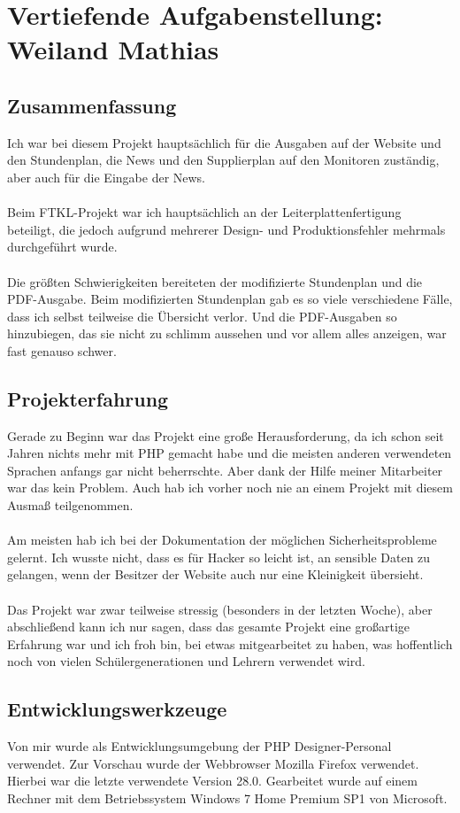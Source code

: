 \chapter[Weiland]{Vertiefende Aufgabenstellung: \\Weiland Mathias}

\section{Zusammenfassung}
Ich war bei diesem Projekt hauptsächlich für die Ausgaben auf der Website und den Stundenplan, die News und den Supplierplan auf den Monitoren zuständig, aber auch für die Eingabe der News. \\\\
Beim FTKL-Projekt war ich hauptsächlich an der Leiterplattenfertigung beteiligt, die jedoch aufgrund mehrerer Design- und Produktionsfehler mehrmals durchgeführt wurde.\\\\
Die größten Schwierigkeiten bereiteten der modifizierte Stundenplan und die PDF-Ausgabe. Beim modifizierten Stundenplan gab es so viele verschiedene Fälle, dass ich selbst teilweise die Übersicht verlor. Und die PDF-Ausgaben so hinzubiegen, das sie nicht zu schlimm aussehen und vor allem alles anzeigen, war fast genauso schwer.
\section{Projekterfahrung}
Gerade zu Beginn war das Projekt eine große Herausforderung, da ich schon seit Jahren nichts mehr mit PHP gemacht habe und die meisten anderen verwendeten Sprachen anfangs gar nicht beherrschte. Aber dank der Hilfe meiner Mitarbeiter war das kein Problem. Auch hab ich vorher noch nie an einem Projekt mit diesem Ausmaß teilgenommen.\\\\
Am meisten hab ich bei der Dokumentation der möglichen Sicherheitsprobleme gelernt. Ich wusste nicht, dass es für Hacker so leicht ist, an sensible Daten zu gelangen, wenn der Besitzer der Website auch nur eine Kleinigkeit übersieht.\\\\
Das Projekt war zwar teilweise stressig (besonders in der letzten Woche), aber abschließend kann ich nur sagen, dass das gesamte Projekt eine großartige Erfahrung war und ich froh bin, bei etwas mitgearbeitet zu haben, was hoffentlich noch von vielen Schülergenerationen und Lehrern verwendet wird.

\section{Entwicklungswerkzeuge}
Von mir wurde als Entwicklungsumgebung der PHP Designer-Personal verwendet. Zur Vorschau wurde der Webbrowser Mozilla Firefox verwendet. Hierbei war die letzte verwendete Version 28.0. Gearbeitet wurde auf einem Rechner mit dem Betriebssystem Windows 7 Home Premium SP1 von Microsoft.